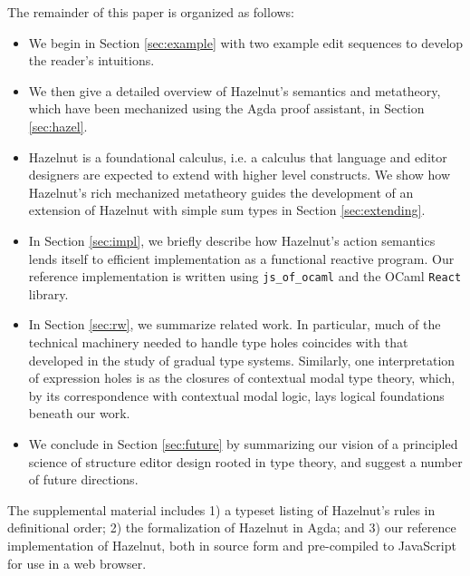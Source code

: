 The remainder of this paper is organized as follows:
\begin{itemize}[itemsep=0px,partopsep=2px,topsep=2px]
\item We begin in Section
    \ref{sec:example} with two example edit sequences to develop the reader's intuitions.  
\item We then give a detailed overview of Hazelnut's semantics and metatheory, which have been mechanized using the Agda proof assistant, in Section \ref{sec:hazel}.
\item Hazelnut is a {foundational} calculus, i.e. a calculus that language and editor designers are expected to extend with higher level constructs. We show how Hazelnut's rich mechanized metatheory guides the development of an extension of Hazelnut with simple sum types in Section \ref{sec:extending}. 
\item In Section \ref{sec:impl}, we briefly describe how Hazelnut's action semantics lends itself to efficient implementation as a functional reactive program. Our reference implementation is written using \lstinline{js_of_ocaml} and the OCaml \lstinline{React} library.
 

\item In Section \ref{sec:rw}, we summarize related work. In particular, much of the technical machinery needed to handle type holes coincides with that developed in the study of gradual type systems. Similarly, one interpretation of expression holes is as the closures of contextual modal type theory, which, by its correspondence with contextual modal logic, lays logical foundations beneath our work. %

\item We conclude in Section \ref{sec:future} by summarizing our vision of a principled science of structure editor design rooted in type theory, and suggest a number of future directions.
\end{itemize} 
The supplemental material includes 1) a typeset listing of Hazelnut's rules in definitional order; 2) the formalization of Hazelnut in Agda; and 3) our reference implementation of Hazelnut, both in source form and pre-compiled to JavaScript for use in a web browser.